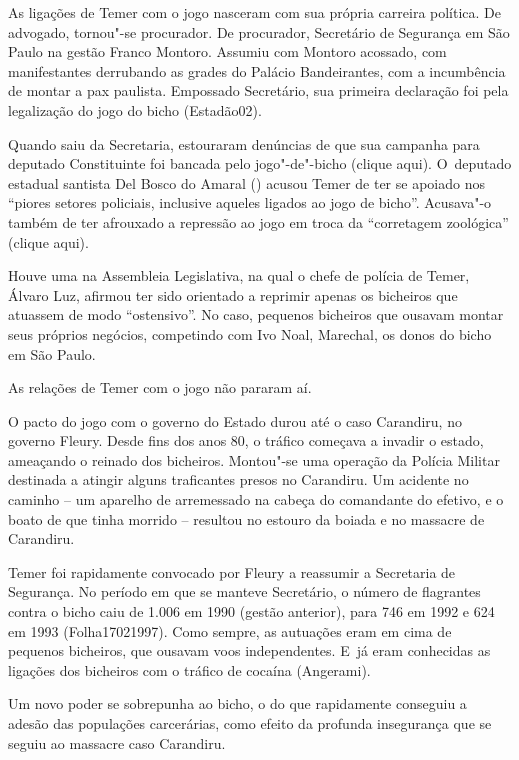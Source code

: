 As ligações de Temer com o jogo nasceram com sua própria carreira
política. De advogado, tornou"-se procurador. De procurador, Secretário
de Segurança em São Paulo na gestão Franco Montoro. Assumiu com Montoro
acossado, com manifestantes derrubando as grades do Palácio
Bandeirantes, com a incumbência de montar a pax paulista. Empossado
Secretário, sua primeira declaração foi pela legalização do jogo do
bicho
({Estadão02}).

Quando saiu da Secretaria, estouraram denúncias de que sua campanha para
deputado Constituinte foi bancada pelo jogo"-de"-bicho
({clique
aqui)}. O~deputado estadual santista Del Bosco do Amaral () acusou
Temer de ter se apoiado nos ``piores setores policiais, inclusive
aqueles ligados ao jogo de bicho''. Acusava"-o também de ter afrouxado a
repressão ao jogo em troca da ``corretagem zoológica''
({clique
aqui}).

Houve uma  na Assembleia Legislativa, na qual o chefe de polícia de
Temer, Álvaro Luz, afirmou ter sido orientado a reprimir apenas os
bicheiros que atuassem de modo ``ostensivo''. No caso, pequenos
bicheiros que ousavam montar seus próprios negócios, competindo com Ivo
Noal, Marechal, os donos do bicho em São Paulo.

As relações de Temer com o jogo não pararam aí.

O pacto do jogo com o governo do Estado durou até o caso Carandiru, no
governo Fleury. Desde fins dos anos 80, o tráfico começava a invadir o
estado, ameaçando o reinado dos bicheiros. Montou"-se uma operação da
Polícia Militar destinada a atingir alguns traficantes presos no
Carandiru. Um acidente no caminho -- um aparelho de  arremessado na
cabeça do comandante do efetivo, e o boato de que tinha morrido --
resultou no estouro da boiada e no massacre de Carandiru.

Temer foi rapidamente convocado por Fleury a reassumir a Secretaria de
Segurança. No período em que se manteve Secretário, o número de
flagrantes contra o bicho caiu de 1.006 em 1990 (gestão anterior), para
746 em 1992 e 624 em 1993
({Folha17021997}).
Como sempre, as autuações eram em cima de pequenos bicheiros, que
ousavam voos independentes. E~já eram conhecidas as ligações dos
bicheiros com o tráfico de cocaína (Angerami).

Um novo poder se sobrepunha ao bicho, o do  que rapidamente conseguiu
a adesão das populações carcerárias, como efeito da profunda insegurança
que se seguiu ao massacre caso Carandiru.


